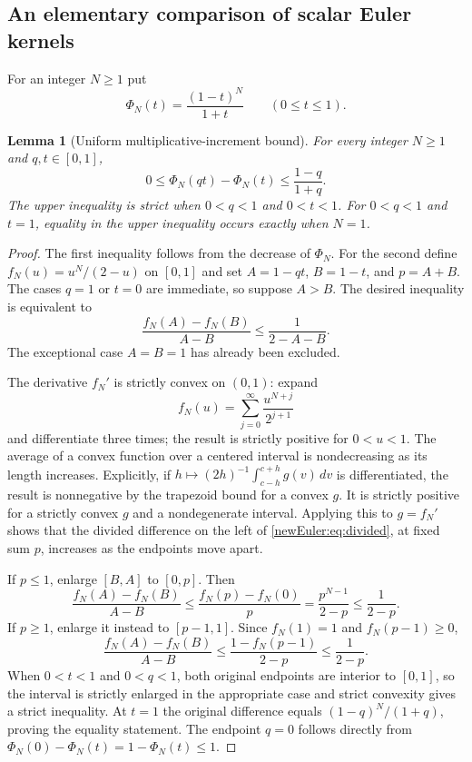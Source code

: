 \documentclass[11pt,letterpaper]{article}
\newtheorem{lemma}[theorem]{Lemma}
\theoremstyle{definition}
\theoremstyle{remark}
\begin{document}
\subsection{An elementary comparison of scalar Euler kernels}

For an integer $N\ge1$ put
\[
 \Phi_N(t)=\frac{(1-t)^N}{1+t}\qquad(0\le t\le1).
\]
\begin{lemma}[Uniform multiplicative-increment bound]
\label{newEuler:lem:scalar}
For every integer $N\ge1$ and $q,t\in[0,1]$,
\begin{equation}\label{newEuler:eq:scalar}
 0\le\Phi_N(qt)-\Phi_N(t)\le\frac{1-q}{1+q}.
\end{equation}
The upper inequality is strict when $0<q<1$ and $0<t<1$.
For $0<q<1$ and $t=1$, equality in the upper inequality occurs
exactly when $N=1$.
\end{lemma}
\begin{proof}
The first inequality follows from the decrease of $\Phi_N$. For the
second define $f_N(u)=u^N/(2-u)$ on $[0,1]$ and set
$A=1-qt$, $B=1-t$, and $p=A+B$. The cases $q=1$ or $t=0$ are
immediate, so suppose $A>B$. The desired inequality is equivalent to
\begin{equation}\label{newEuler:eq:divided}
 \frac{f_N(A)-f_N(B)}{A-B}\le\frac1{2-A-B}.
\end{equation}
The exceptional case $A=B=1$ has already been excluded.

The derivative $f_N'$ is strictly convex on $(0,1)$: expand
\[
 f_N(u)=\sum_{j=0}^{\infty}\frac{u^{N+j}}{2^{j+1}}
\]
and differentiate three times; the result is strictly positive for
$0<u<1$. The average of a convex function over a centered interval
is nondecreasing as its length increases. Explicitly, if
$h\mapsto (2h)^{-1}\int_{c-h}^{c+h}g(v)\,dv$ is differentiated,
the result is nonnegative by the trapezoid bound for a convex $g$.
It is strictly positive for a strictly convex $g$ and a nondegenerate
interval. Applying this to $g=f_N'$ shows that the divided difference
on the left of \eqref{newEuler:eq:divided}, at fixed sum $p$, increases
as the endpoints move apart.

If $p\le1$, enlarge $[B,A]$ to $[0,p]$. Then
\[
 \frac{f_N(A)-f_N(B)}{A-B}
 \le\frac{f_N(p)-f_N(0)}p
 =\frac{p^{N-1}}{2-p}\le\frac1{2-p}.
\]
If $p\ge1$, enlarge it instead to $[p-1,1]$. Since $f_N(1)=1$
and $f_N(p-1)\ge0$,
\[
 \frac{f_N(A)-f_N(B)}{A-B}
 \le\frac{1-f_N(p-1)}{2-p}\le\frac1{2-p}.
\]
When $0<t<1$ and $0<q<1$, both original endpoints are interior
to $[0,1]$, so the interval is strictly enlarged in the appropriate
case and strict convexity gives a strict inequality. At $t=1$ the
original difference equals $(1-q)^N/(1+q)$, proving the equality
statement. The endpoint $q=0$ follows directly from
$\Phi_N(0)-\Phi_N(t)=1-\Phi_N(t)\le1$.
\end{proof}
\end{document}
